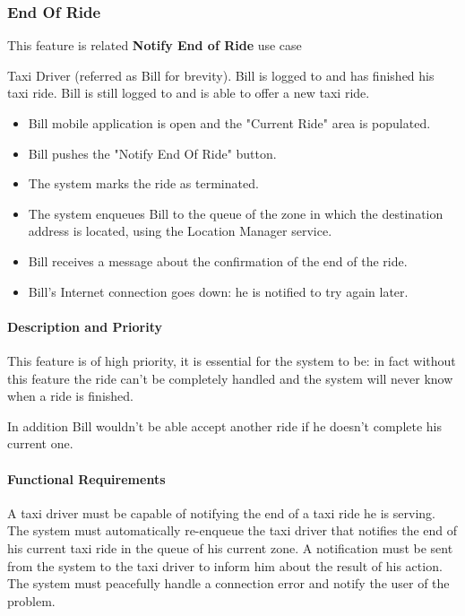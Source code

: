 \subsubsection{End Of Ride}
This feature is related \textbf{Notify End of Ride} use case
\begin{itemize}
	 Taxi Driver (referred as Bill for brevity).
	 Bill is logged to \myTaxiService{} and has finished his taxi ride.
	 Bill is still logged to \myTaxiService{} and is able to offer a new taxi ride.
	\begin{itemize}
		\item Bill \myTaxiService{} mobile application is open and the "Current Ride" area is populated.
		\item Bill pushes the "Notify End Of Ride" button.
		\item The system marks the ride as terminated.
		\item The system enqueues Bill to the queue of the zone in which the destination address is located, using the Location Manager service.
		\item Bill receives a message about the confirmation of the end of the ride. 
	\end{itemize}
	\begin{itemize}
		\item Bill's Internet connection goes down: he is notified to try again later.
	\end{itemize}
\end{itemize}
\paragraph{Description and Priority}
This feature is of high priority, it is essential for the system to be: in fact without this feature the ride can't be completely handled and the system will never know when a ride is finished.\par In addition Bill wouldn't be able accept another ride if he doesn't complete his current one.
\paragraph{Functional Requirements}
\begin{itemize}
	 A taxi driver must be capable of notifying the end of a taxi ride he is serving.
	 The system must automatically re-enqueue the taxi driver that notifies the end of his current taxi ride in the queue of his current zone.
	 A notification must be sent from the system to the taxi driver to inform him about the result of his action.
	 The system must peacefully handle a connection error and notify the user of the problem.
\end{itemize}
